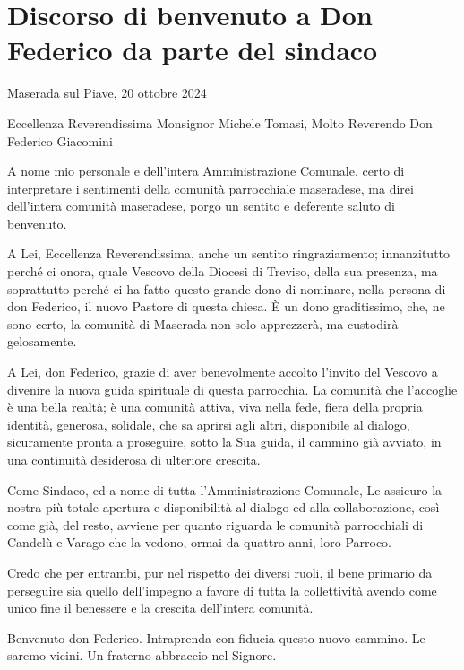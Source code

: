 \section{Discorso di benvenuto a Don Federico da parte del sindaco}

Maserada sul Piave, 20 ottobre 2024

Eccellenza Reverendissima Monsignor Michele Tomasi, Molto Reverendo Don Federico Giacomini

A nome mio personale e dell'intera Amministrazione Comunale, certo di interpretare i sentimenti della comunità parrocchiale maseradese, ma direi dell'intera comunità maseradese, porgo un sentito e deferente saluto di benvenuto.

A Lei, Eccellenza Reverendissima, anche un sentito ringraziamento; innanzitutto perché ci onora, quale Vescovo della Diocesi di Treviso, della sua presenza, ma soprattutto perché ci ha fatto questo grande dono di nominare, nella persona di don Federico, il nuovo Pastore di questa chiesa. È un dono graditissimo, che, ne sono certo, la comunità di Maserada non solo apprezzerà, ma custodirà gelosamente.

A Lei, don Federico, grazie di aver benevolmente accolto l'invito del Vescovo a divenire la nuova guida spirituale di questa parrocchia. La comunità che l'accoglie è una bella realtà; è una comunità attiva, viva nella fede, fiera della propria identità, generosa, solidale, che sa aprirsi agli altri, disponibile al dialogo, sicuramente pronta a proseguire, sotto la Sua guida, il cammino già avviato, in una continuità desiderosa di ulteriore crescita.

Come Sindaco, ed a nome di tutta l'Amministrazione Comunale, Le assicuro la nostra più totale apertura e disponibilità al dialogo ed alla collaborazione, così come già, del resto, avviene per quanto riguarda le comunità parrocchiali di Candelù e Varago che la vedono, ormai da quattro anni, loro Parroco.

Credo che per entrambi, pur nel rispetto dei diversi ruoli, il bene primario da perseguire sia quello dell'impegno a favore di tutta la collettività avendo come unico fine il benessere e la crescita dell'intera comunità.

Benvenuto don Federico. Intraprenda con fiducia questo nuovo cammino. Le saremo vicini. Un fraterno abbraccio nel Signore.

